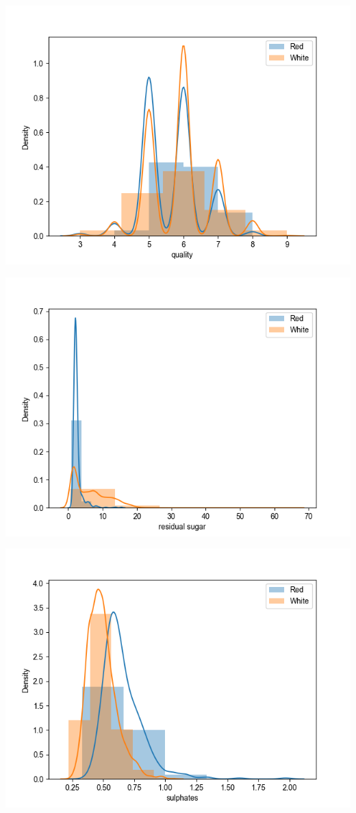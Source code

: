 \documentclass[12pt, letterpaper]{article}
\begin{document}
\includegraphics[scale=\myscale]{class_dist_quality.png}

\includegraphics[scale=\myscale]{class_dist_residual_sugar.png}

\includegraphics[scale=\myscale]{class_dist_sulphates.png}
\end{document}
